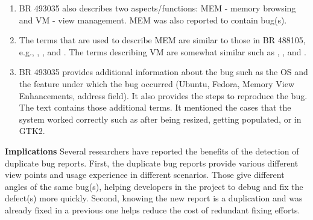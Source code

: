 \begin{enumerate}


\item BR 493035 also describes two aspects/functions: MEM - memory
  browsing and VM - view management. MEM was also reported to contain
  bug(s).

\item The terms that are used to describe MEM are similar to those in
  BR 488105, e.g., , , and
  . The terms describing VM are somewhat similar
  such as , , and .

\item BR 493035 provides additional information about the bug such as
  the OS and the feature under which the bug occurred (Ubuntu, Fedora,
  Memory View Enhancements, address field). It also provides the steps
  to reproduce the bug. The text contains those additional terms. It
  mentioned the cases that the system worked correctly such as after
  being resized, getting populated, or in GTK2.



\end{enumerate}

\vspace{0.03in}\noindent\textbf{Implications} Several researchers have
reported the benefits of the detection of duplicate bug
reports. First, the duplicate bug reports provide various different
view points and usage experience in different scenarios. Those give
different angles of the same bug(s), helping developers in the project
to debug and fix the defect(s) more quickly. Second, knowing the new
report is a duplication and was already fixed in a previous one helps
reduce the cost of redundant fixing efforts.

